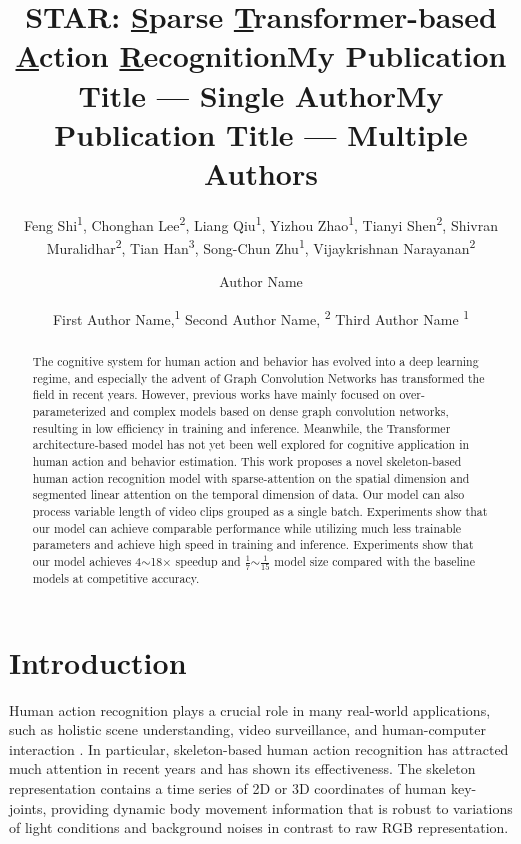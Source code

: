 \documentclass[letterpaper]{article} %
\title{STAR: \underline{S}parse \underline{T}ransformer-based \underline{A}ction \underline{R}ecognition}
\author{
    
    
    Feng Shi\textsuperscript{\rm 1}, 
    Chonghan Lee\textsuperscript{\rm 2}, 
    Liang Qiu\textsuperscript{\rm 1}, 
    Yizhou Zhao\textsuperscript{\rm 1}, 
    Tianyi Shen\textsuperscript{\rm 2}, 
    Shivran Muralidhar\textsuperscript{\rm 2}, 
    Tian Han\textsuperscript{\rm 3},
    Song-Chun Zhu\textsuperscript{\rm 1}, 
    Vijaykrishnan Narayanan\textsuperscript{\rm 2}
    \\
}
\title{My Publication Title --- Single Author}
\author {
    Author Name \\
}
\title{My Publication Title --- Multiple Authors}
\author {
    First Author Name,\textsuperscript{\rm 1}
    Second Author Name, \textsuperscript{\rm 2}
    Third Author Name \textsuperscript{\rm 1} \\
}
\begin{document}
\maketitle

\begin{abstract}
The cognitive system for human action and behavior has evolved into a deep learning regime, and especially the advent of Graph Convolution Networks has transformed the field in recent years. However, previous works have mainly focused on over-parameterized and complex models based on dense graph convolution networks, resulting in low efficiency in training and inference. Meanwhile, the Transformer architecture-based model has not yet been well explored for cognitive application in human action and behavior estimation. This work proposes a novel skeleton-based human action recognition model with sparse-attention on the spatial dimension and segmented linear attention on the temporal dimension of data. Our model can also process variable length of video clips grouped as a single batch. Experiments show that our model can achieve comparable performance while utilizing much less trainable parameters and achieve high speed in training and inference. Experiments show that our model achieves 4$\sim$18$\times$ speedup and $\frac{1}{7}$$\sim$$\frac{1}{15}$ model size compared with the baseline models at competitive accuracy.
\end{abstract}

\section{Introduction}
Human action recognition plays a crucial role in many real-world applications, such as holistic scene understanding, video surveillance, and human-computer interaction \cite{vsurveilance, hcinter/978-3-540-78566-8_10}. In particular, skeleton-based human action recognition has attracted much attention in recent years and has shown its effectiveness. The skeleton representation contains a time series of 2D or 3D coordinates of human key-joints, providing dynamic body movement information that is robust to variations of light conditions and background noises in contrast to raw RGB representation.
\end{document}
